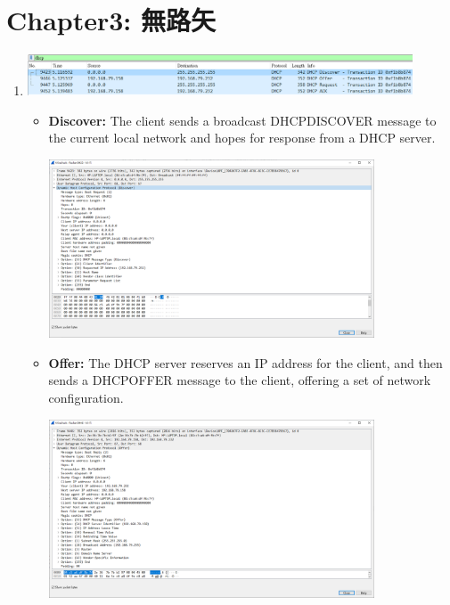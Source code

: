 \documentclass[12pt, a4paper]{article}
\begin{document}
  \pagebreak
  \section*{Chapter3: 無路矢}
  \begin{enumerate}
    \item\phantom{}\vspace{-\baselineskip}

    \includegraphics[width=0.9\textwidth]{wireshark_dhcp.png}

    \begin{itemize}
      \item \textbf{Discover:} The client sends a broadcast DHCPDISCOVER message
       to the current local network and hopes for response from a DHCP server.

      \includegraphics[width=0.8\textwidth]{wireshark_dhcp_discover.png}

      \item \textbf{Offer:} The DHCP server reserves an IP address for the
      client, and then sends a DHCPOFFER message to the client, offering a
      set of network configuration.

      \includegraphics[width=0.8\textwidth]{wireshark_dhcp_offer.png}


\end{itemize}
\end{enumerate}
\end{document}

